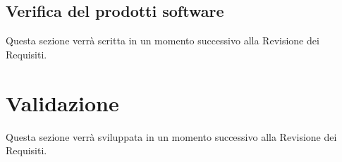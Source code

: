 \subsection{Verifica del prodotti software}
Questa sezione verrà scritta in un momento successivo alla Revisione dei Requisiti.
\section{Validazione}
Questa sezione verrà sviluppata in un momento successivo alla Revisione dei Requisiti.



